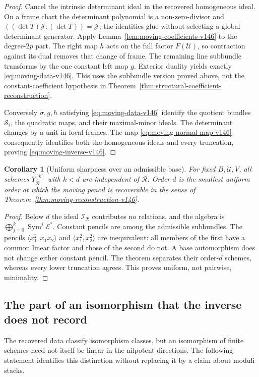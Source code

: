 \documentclass[11pt,reqno]{amsart}
\numberwithin{equation}{section}
\newtheorem{corollary}[theorem]{Corollary}
\theoremstyle{definition}\newtheorem{definition}[theorem]{Definition}
\theoremstyle{remark}\newtheorem{remark}[theorem]{Remark}
\DeclareMathOperator{\Sym}{Sym}\DeclareMathOperator{\Gr}{Gr}
\begin{document}
\begin{proof}
Cancel the intrinsic determinant ideal in the recovered homogeneous
ideal.  On a frame chart the determinant polynomial is a
non-zero-divisor and
\(( (\det T)\mathcal J:(\det T))=\mathcal J\); the identities glue
without selecting a global determinant generator.  Apply
Lemma~\ref{lem:moving-coefficients-v146} to the degree-\(2p\) part.
The right map \(h\) acts on the full factor \(F(\mathcal U)\), so
contraction against its dual removes that change of frame.  The
remaining line subbundle transforms by the one constant left map
\(g\).  Exterior duality yields exactly
\eqref{eq:moving-data-v146}.  This uses the subbundle version proved
above, not the constant-coefficient hypothesis in
Theorem~\ref{thm:structural-coefficient-reconstruction}.

Conversely \(\sigma,g,h\) satisfying \eqref{eq:moving-data-v146}
identify the quotient bundles \(\mathcal S_i\), the quadratic maps,
and their maximal-minor ideals.  The determinant changes by a unit
in local frames.  The map \eqref{eq:moving-normal-map-v146} consequently
identifies both the homogeneous ideals and every truncation,
proving \eqref{eq:moving-inverse-v146}.
\end{proof}

\begin{corollary}[Uniform sharpness over an admissible base]
\label{cor:moving-sharpness-v146}
For fixed \(B,\mathcal U,V\), all schemes
\(Y_{\mathcal R}^{[k]}\) with \(k<d\) are independent of
\(\mathcal R\).  Order \(d\) is the smallest uniform order at which
the moving pencil is recoverable in the sense of
Theorem~\ref{thm:moving-reconstruction-v146}.
\end{corollary}
\begin{proof}
Below \(d\) the ideal \(\mathcal I_{\mathcal R}\) contributes no
relations, and the algebra is
\(\bigoplus_{j=0}^k\Sym^j\mathcal E^*\).  Constant pencils are
among the admissible subbundles.  The pencils
\(\langle x_1^2,x_1x_2\rangle\) and
\(\langle x_1^2,x_2^2\rangle\) are inequivalent: all members of
the first have a common linear factor and those of the second do
not.  A base automorphism does not change either constant pencil.
The theorem separates their order-\(d\) schemes, whereas every
lower truncation agrees.  This proves uniform, not pairwise, minimality.
\end{proof}

\subsection{The part of an isomorphism that the inverse does not record}
The recovered data classify isomorphism classes, but an isomorphism
of finite schemes need not itself be linear in the nilpotent
directions.  The following statement identifies this distinction
without replacing it by a claim about moduli stacks.
\end{document}
